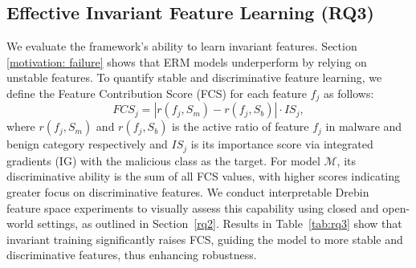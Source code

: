 
\begin{center}
\end{center}




\subsection{Effective Invariant Feature Learning (RQ3)}
\label{rq3}
We evaluate the framework’s ability to learn invariant features. Section \ref{motivation: failure} shows that ERM models underperform by relying on unstable features. To quantify stable and discriminative feature learning, we define the Feature Contribution Score (FCS) for each feature $f_j$ as follows:
\begin{equation}
    FCS_j = \left|r\left(f_j, S_m\right)-r\left(f_j, S_b\right)\right| \cdot IS_j,
\end{equation}
where $r(f_j, S_m)$ and $r(f_j, S_b)$ is the active ratio of feature $f_j$ in malware and benign category respectively and $IS_j$ is its importance score via integrated gradients (IG) with the malicious class as the target. For model $\mathcal{M}$, its discriminative ability is the sum of all FCS values, with higher scores indicating greater focus on discriminative features. We conduct interpretable Drebin~\cite{Arpdrebin} feature space experiments to visually assess this capability using closed and open-world settings, as outlined in Section~\ref{rq2}. Results in Table~\ref{tab:rq3} show that invariant training significantly raises FCS, guiding the model to more stable and discriminative features, thus enhancing robustness.

